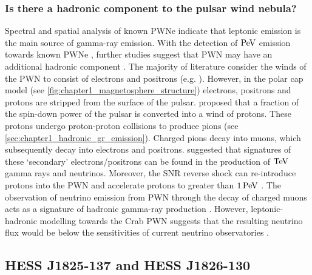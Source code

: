 \subsubsection{Is there a hadronic component to the pulsar wind nebula?}

Spectral and spatial analysis of known PWNe indicate that leptonic emission is the main source of gamma-ray emission. With the detection of $\PeV$ emission towards known PWNe \citep{doi:10.1126/science.abg5137}, further studies suggest that PWN may have an additional hadronic component \citep{2006A&A...451L..51H, 10.1111/j.1745-3933.2010.00934.x, Xin_2019, 2021ApJ...922..221L}. The majority of literature consider the winds of the PWN to consist of electrons and positrons (e.g. \cite{2018A&A...612A...2H}). However, in the polar cap model (see \autoref{fig:chapter1_magnetosphere_structure}) electrons, positrons and protons are stripped from the surface of the pulsar. \cite{1994ApJ...435..230G} proposed that a fraction of the spin-down power of the pulsar is converted into a wind of protons. These protons undergo proton-proton collisions to produce pions (see \autoref{sec:chapter1_hadronic_gr_emission}). Charged pions decay into muons, which subsequently decay into electrons and positrons. \cite{2003A&A...402..827A} suggested that signatures of these `secondary' electrons/positrons can be found in the production of $\TeV$ gamma rays and neutrinos. Moreover, the SNR reverse shock can re-introduce protons into the PWN and accelerate protons to greater than $1\,\PeV$ \citep{1992MNRAS.257..493B,2018MNRAS.478..926O}. The observation of neutrino emission from PWN through the decay of charged muons acts as a signature of hadronic gamma-ray production \citep{2006A&A...451L..51H}. However, leptonic-hadronic modelling towards the Crab PWN suggests that the resulting neutrino flux would be below the sensitivities of current neutrino observatories \citep{2022ApJ...926....7P}.

\subsection{HESS J1825-137 and HESS J1826-130} \label{sec:01_1825_1826}


